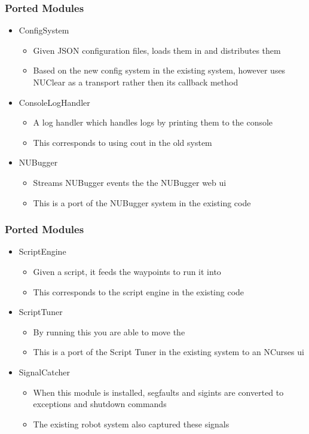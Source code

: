 \documentclass{beamer}
\begin{document}
\begin{frame}
	\frametitle{Ported Modules}
	\begin{itemize}
		\item ConfigSystem
			\begin{itemize}
				\item Given JSON configuration files, loads them in and distributes them
				\item Based on the new config system in the existing system, however uses NUClear as a transport rather then its callback method
			\end{itemize}
			
		\item ConsoleLogHandler
			\begin{itemize}
				\item A log handler which handles logs by printing them to the console
				\item This corresponds to using cout in the old system
			\end{itemize}
			
		\item NUBugger
			\begin{itemize}
				\item Streams NUBugger events the the NUBugger web ui
				\item This is a port of the NUBugger system in the existing code
			\end{itemize}
		\end{itemize}
\end{frame}

\begin{frame}
	\frametitle{Ported Modules}
	\begin{itemize}
		\item ScriptEngine
			\begin{itemize}
				\item Given a script, it feeds the waypoints to run it into 
				\item This corresponds to the script engine in the existing code
			\end{itemize}

		\item ScriptTuner
			\begin{itemize}
				\item By running this you are able to move the
				\item This is a port of the Script Tuner in the existing system to an NCurses ui
			\end{itemize}
			
		\item SignalCatcher
			\begin{itemize}
				\item When this module is installed, segfaults and sigints are converted to exceptions and shutdown commands
				\item The existing robot system also captured these signals
			\end{itemize}
	\end{itemize}
\end{frame}
			
\end{document}
